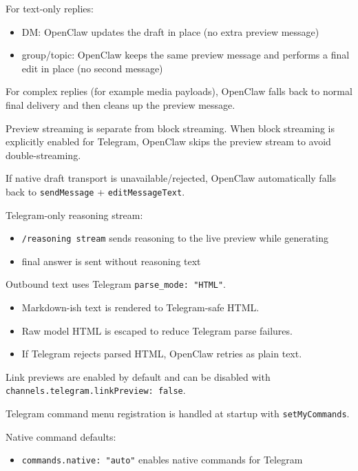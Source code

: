 For text-only replies:

\begin{itemize}
  \item DM: OpenClaw updates the draft in place (no extra preview message)
  \item group/topic: OpenClaw keeps the same preview message and performs a final edit in place (no second message)
\end{itemize}


For complex replies (for example media payloads), OpenClaw falls back to normal final delivery and then cleans up the preview message.

Preview streaming is separate from block streaming. When block streaming is explicitly enabled for Telegram, OpenClaw skips the preview stream to avoid double-streaming.

If native draft transport is unavailable/rejected, OpenClaw automatically falls back to \texttt{sendMessage} + \texttt{editMessageText}.

Telegram-only reasoning stream:

\begin{itemize}
  \item \texttt{/reasoning stream} sends reasoning to the live preview while generating
  \item final answer is sent without reasoning text
\end{itemize}



Outbound text uses Telegram \texttt{parse\_mode: "HTML"}.

\begin{itemize}
  \item Markdown-ish text is rendered to Telegram-safe HTML.
  \item Raw model HTML is escaped to reduce Telegram parse failures.
  \item If Telegram rejects parsed HTML, OpenClaw retries as plain text.
\end{itemize}


Link previews are enabled by default and can be disabled with \texttt{channels.telegram.linkPreview: false}.


Telegram command menu registration is handled at startup with \texttt{setMyCommands}.

Native command defaults:

\begin{itemize}
  \item \texttt{commands.native: "auto"} enables native commands for Telegram
\end{itemize}


